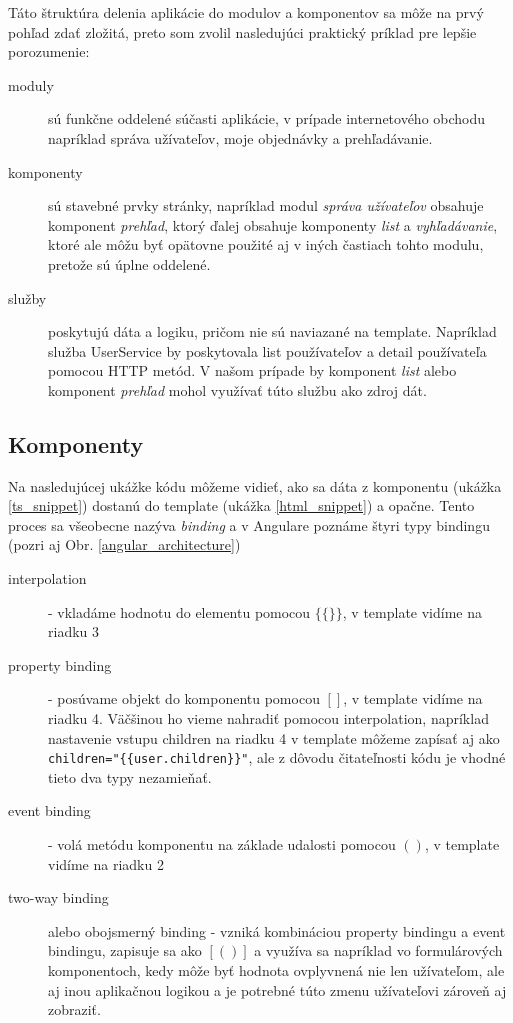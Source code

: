 \documentclass[
  digital, %
  twoside, %
  notable,   %
  nolof,   %
  nolot,   %
]{fithesis3}
\begin{document}
Táto štruktúra delenia aplikácie do modulov a komponentov sa môže na prvý pohľad zdať zložitá, preto som zvolil nasledujúci praktický príklad pre lepšie porozumenie:
\begin{description}
\item[moduly] sú funkčne oddelené súčasti aplikácie, v prípade internetového obchodu napríklad správa užívateľov, moje objednávky a prehľadávanie.
\item[komponenty] sú stavebné prvky stránky, napríklad modul \textit{správa užívateľov} obsahuje komponent \textit{prehľad}, ktorý ďalej obsahuje komponenty \textit{list} a \textit{vyhľadávanie}, ktoré ale môžu byť opätovne použité aj v iných častiach tohto modulu, pretože sú úplne oddelené.
\item[služby] poskytujú dáta a logiku, pričom nie sú naviazané na template. Napríklad služba UserService by poskytovala list používateľov a detail používateľa pomocou HTTP metód. V našom prípade by komponent \textit{list} alebo komponent \textit{prehľad} mohol využívať túto službu ako zdroj dát.
\end{description}

\subsection{Komponenty}
Na nasledujúcej ukážke kódu môžeme vidieť, ako sa dáta z komponentu (ukážka \ref{ts_snippet}) dostanú do template (ukážka \ref{html_snippet}) a opačne. Tento proces sa všeobecne nazýva \textit{binding} a v Angulare poznáme štyri typy bindingu (pozri aj Obr. \ref{angular_architecture})
\begin{description}
\item[interpolation] - vkladáme hodnotu do elementu pomocou $\{\{\}\}$, v template vidíme na riadku 3
\item[property binding] - posúvame objekt do komponentu pomocou $[ ]$, v template vidíme na riadku 4. Väčšinou ho vieme nahradiť pomocou interpolation, napríklad nastavenie vstupu children na riadku 4 v template môžeme zapísať aj ako\\
\texttt{children="\{\{user.children\}\}"}, ale z dôvodu čitateľnosti kódu je vhodné tieto dva typy nezamieňať.
\item[event binding] - volá metódu komponentu na základe udalosti pomocou $()$, v template vidíme na riadku 2
\item[two-way binding] alebo obojsmerný binding - vzniká kombináciou property bindingu a event bindingu, zapisuje sa ako $[( )]$ a využíva sa napríklad vo formulárových komponentoch, kedy môže byť hodnota ovplyvnená nie len užívateľom, ale aj inou aplikačnou logikou a je potrebné túto zmenu užívateľovi zároveň aj zobraziť.
\end{description}
\end{document}
